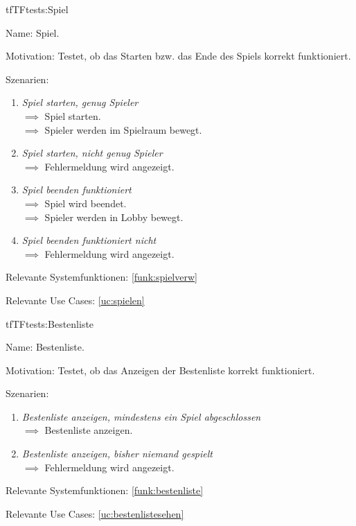 \begin{description}[leftmargin=5em, style=sameline]

\begin{lhp}{tf}{TF}{tests:Spiel}
	\item [Name:] Spiel.
	\item [Motivation:] Testet, ob das Starten bzw. das Ende des Spiels korrekt funktioniert.
	\item [Szenarien:] \hfill
		\begin{enumerate}
			\item \textit{Spiel starten, genug Spieler} \\ $\implies$ Spiel starten.
														\\ $\implies$ Spieler werden im Spielraum bewegt.
			\item \textit{Spiel starten, nicht genug Spieler} \\ $\implies$ Fehlermeldung wird angezeigt.
			\item \textit{Spiel beenden funktioniert} \\ $\implies$ Spiel wird  beendet.
													  \\ $\implies$ Spieler werden  in Lobby bewegt.
			\item \textit{Spiel beenden funktioniert nicht} \\ $\implies$ Fehlermeldung wird angezeigt.
		\end{enumerate}
	\item [Relevante Systemfunktionen:] \ref{funk:spielverw}
	\item [Relevante Use Cases:] \ref{uc:spielen}
\end{lhp}

\end{description}


\begin{description}[leftmargin=5em, style=sameline]

\begin{lhp}{tf}{TF}{tests:Bestenliste}
	\item [Name:] Bestenliste.
	\item [Motivation:] Testet, ob das Anzeigen der Bestenliste  korrekt funktioniert.
	\item [Szenarien:] \hfill
		\begin{enumerate}
			\item \textit{Bestenliste anzeigen, mindestens ein Spiel abgeschlossen} \\ $\implies$ Bestenliste anzeigen.
			\item \textit{Bestenliste anzeigen, bisher niemand gespielt} \\ $\implies$ Fehlermeldung wird angezeigt.
		\end{enumerate}
	\item [Relevante Systemfunktionen:] \ref{funk:bestenliste}
	\item [Relevante Use Cases:] \ref{uc:bestenlistesehen}
\end{lhp}

\end{description}


